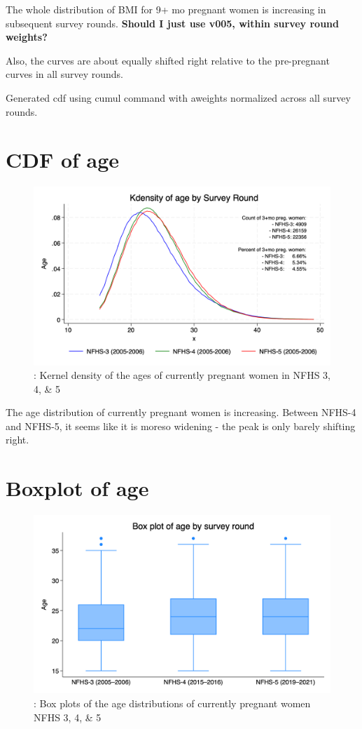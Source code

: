 \documentclass{article}
\begin{document}
The whole distribution of BMI for 9+ mo pregnant women is increasing in subsequent survey rounds. \textbf{Should I just use v005, within survey round weights?}

Also, the curves are about equally shifted right relative to the pre-pregnant curves in all survey rounds. 

Generated cdf using cumul command with aweights normalized across all survey rounds.

\section{CDF of age}

\begin{figure}[H]
    \centering
    \includegraphics[width=\textwidth]{figures/kdensities ages.png}
    \caption{: Kernel density of the ages of currently pregnant women in NFHS 3, 4, \& 5}
\end{figure}

The age distribution of currently pregnant women is increasing. Between NFHS-4 and NFHS-5, it seems like it is moreso widening - the peak is only barely shifting right. 

\section{Boxplot of age}

\begin{figure}[H]
    \centering
    \includegraphics[width=\textwidth]{figures/boxplots ages.png}
    \caption{: Box plots of the age distributions of currently pregnant women NFHS 3, 4, \& 5}
\end{figure}
\end{document}
